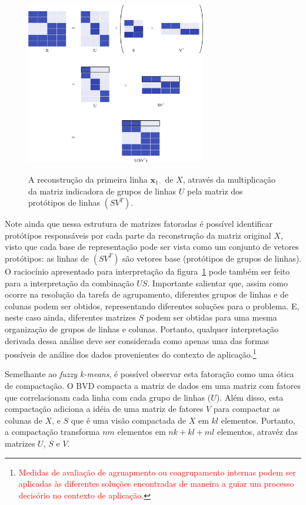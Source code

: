 \documentclass[
    12pt,                %
    oneside,            %
    a4paper,            %
    english,            %
    brazil                %
    ]{abntex2ppgsi}
\begin{document}
\begin{figure}[H]
\centering
\caption{
A reconstrução da primeira linha $\mathbf{x}_{1 \cdot}$ de $X$, através da multiplicação da matriz indicadora de grupos de linhas $U$ pela matriz dos protótipos de linhas $(S V^T)$. %
}
\includegraphics[width=0.7\textwidth]{img/reconstruction.png}
\label{fig:bvd:reconstruction}
\end{figure}

Note ainda que nessa estrutura de matrizes fatoradas é possível identificar protótipos responsáveis por cada parte da reconstrução da matriz original $X$, visto que cada base de representação pode ser vista como um conjunto de vetores protótipos: as linhas de $(SV^T)$ são vetores base (protótipos de grupos de linhas).
O raciocínio apresentado para interpretação da figura~\ref{fig:bvd:reconstruction} pode também ser feito para a interpretação da combinação $US$.
Importante salientar que, assim como ocorre na resolução da tarefa de agrupamento, diferentes grupos de linhas e de colunas podem ser obtidos, representando diferentes soluções para o problema.
E, neste caso ainda, diferentes matrizes $S$ podem ser obtidas para uma mesma organização de grupos de linhas e colunas.
Portanto, qualquer interpretação derivada dessa análise deve ser considerada como apenas uma das formas possíveis de análise dos dados provenientes do contexto de aplicação.\footnote{\textcolor{red}{Medidas de avaliação de agruapmento ou coagrupamento internas podem ser aplicadas às diferentes soluções encontradas de maneira a guiar um processo decisório no contexto de aplicação.}}

Semelhante ao \textit{fuzzy k-means}, é possível observar esta fatoração como uma ótica de compactação.
O BVD compacta a matriz de dados em uma matriz com fatores que correlacionam cada linha com cada grupo de linhas ($U$).
Além disso, esta compactação adiciona a idéia de uma matriz de fatores $V$ para compactar as colunas de $X$, e $S$ que é uma visão compactada de $X$ em $kl$ elementos.
Portanto, a compactação transforma $nm$ elementos em $nk + kl + ml$ elementos, atravéz das matrizes $U$, $S$ e $V$.
\end{document}
